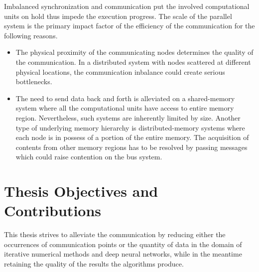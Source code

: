 Imbalanced synchronization and communication put the involved computational 
units on hold thus impede the execution progress. The scale of the parallel 
system is the primary impact factor of the efficiency of the communication for 
the following reasons.
\begin{itemize}
    \item The physical proximity of the communicating nodes determines the 
        quality of the communication. In a distributed system with nodes 
        scattered at different physical locations, the communication inbalance 
        could create serious bottlenecks.
    \item The need to send data back and forth is alleviated on a shared-memory 
        system where all the computational units have access to entire memory 
        region.  Nevertheless, such systems are inherently limited by size.  
        Another type of underlying memory hierarchy is distributed-memory 
        systems where each node is in possess of a portion of the entire memory.  
        The acquisition of contents from other memory regions has to be resolved 
        by passing messages which could raise contention on the bus system.
\end{itemize}
 
\section{Thesis Objectives and Contributions}
This thesis strives to alleviate the communication by reducing either the 
occurrences of communication points or the quantity of data in the domain of 
iterative numerical methods and deep neural networks, while in the meantime 
retaining the quality of the results the algorithms produce. 

